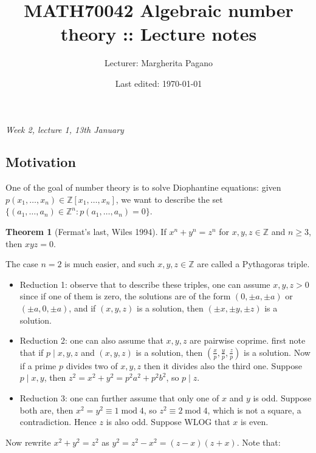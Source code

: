 \documentclass{article}
\title{MATH70042 Algebraic number theory :: Lecture notes}
\author{Lecturer: Margherita Pagano}
\date{Last edited: \today}
\newcommand{\Z}{\mathbb{Z}}
\newcommand{\Mod}{\operatorname{mod}}
\theoremstyle{definition}
\newtheorem{thm}[defn]{Theorem}
\begin{document}
\maketitle
\thispagestyle{empty}

\tableofcontents
\thispagestyle{empty}
\newpage
\setcounter{page}{1}

\begin{flushright}
\textit{Week 2, lecture 1, 13th January}
\end{flushright}

\subsection*{Motivation}
One of the goal of number theory is to solve Diophantine equations: given $p(x_1,\ldots,x_n)\in\Z[x_1,\ldots,x_n]$, we want to describe the set $\{(a_1,\ldots,a_n)\in\Z^n:p(a_1,\ldots,a_n)=0\}$.

\begin{thm}[Fermat's last, Wiles 1994]
If $x^n+y^n=z^n$ for $x,y,z\in\Z$ and $n\geq 3$, then $xyz=0$.
\end{thm}

The case $n=2$ is much easier, and such $x,y,z\in\Z$ are called a Pythagoras triple.

\begin{itemize}
\item Reduction 1: observe that to describe these triples, one can assume $x,y,z>0$ since if one of them is zero, the solutions are of the form $(0,\pm a,\pm a)$ or $(\pm a,0,\pm a)$, and if $(x,y,z)$ is a solution, then $(\pm x,\pm y,\pm z)$ is a solution.
\item Reduction 2: one can also assume that $x,y,z$ are pairwise coprime. first note that if $p\mid x,y,z$ and $(x,y,z)$ is a solution, then $\left(\frac{x}{p},\frac{y}{p},\frac{z}{p}\right)$ is a solution. Now if a prime $p$ divides two of $x,y,z$ then it divides also the third one. Suppose $p\mid x,y$, then $z^2=x^2+y^2=p^2a^2+p^2b^2$, so $p\mid z$.
\item Reduction 3: one can further assume that only one of $x$ and $y$ is odd. Suppose both are, then $x^2=y^2\equiv 1\Mod 4$, so $z^2\equiv 2\Mod 4$, which is not a square, a contradiction. Hence $z$ is also odd. Suppose WLOG that $x$ is even.
\end{itemize}

Now rewrite $x^2+y^2=z^2$ as $y^2=z^2-x^2=(z-x)(z+x)$. Note that:
\end{document}
